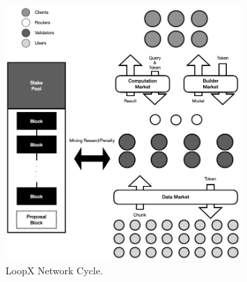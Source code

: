 \documentclass[11pt,letterpaper]{article}
\begin{document}
\begin{figure}[t]
\centering
	\includegraphics[width=0.8\textwidth]{fig/tokenomics.png}
\caption{LoopX Network Cycle.} 
\label{fig:tokenomics}
\vspace{-2pt}
\end{figure}
\end{document}

